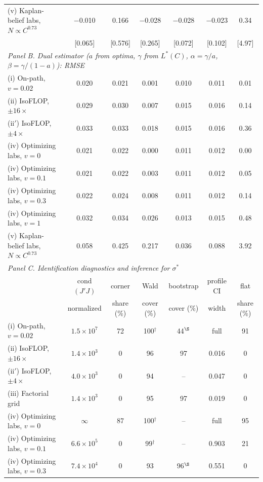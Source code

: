 \begin{table}[!htbp]
\begin{threeparttable}
\begin{tabular}{lcccccc}
(v) Kaplan-belief labs, $N\propto C^{0.73}$ & $-$0.010 & 0.166 & $-$0.028 & $-$0.028 & $-$0.023 & 0.34 \\
 & [0.065] & [0.576] & [0.265] & [0.072] & [0.102] & [4.97] \\[2pt]
\midrule
\multicolumn{7}{l}{\textit{Panel B. Dual estimator ($a$ from optima, $\gamma$ from $L^*(C)$, $\alpha=\gamma/a$, $\beta=\gamma/(1-a)$): RMSE}} \\
(i) On-path, $v=0.02$ & 0.020 & 0.021 & 0.001 & 0.010 & 0.011 & 0.01 \\
(ii) IsoFLOP, $\pm16\times$ & 0.029 & 0.030 & 0.007 & 0.015 & 0.016 & 0.14 \\
(ii$'$) IsoFLOP, $\pm4\times$ & 0.033 & 0.033 & 0.018 & 0.015 & 0.016 & 0.36 \\
(iv) Optimizing labs, $v=0$ & 0.021 & 0.022 & 0.000 & 0.011 & 0.012 & 0.00 \\
(iv) Optimizing labs, $v=0.1$ & 0.021 & 0.022 & 0.003 & 0.011 & 0.012 & 0.05 \\
(iv) Optimizing labs, $v=0.3$ & 0.022 & 0.024 & 0.008 & 0.011 & 0.012 & 0.14 \\
(iv) Optimizing labs, $v=1$ & 0.032 & 0.034 & 0.026 & 0.013 & 0.015 & 0.48 \\
(v) Kaplan-belief labs, $N\propto C^{0.73}$ & 0.058 & 0.425 & 0.217 & 0.036 & 0.088 & 3.92 \\
\midrule
\multicolumn{7}{l}{\textit{Panel C. Identification diagnostics and inference for $\sigma^*$}} \\
 & cond$(J'J)$ & corner & Wald & bootstrap & profile CI & flat \\
 & normalized & share (\%) & cover (\%) & cover (\%) & width & share (\%) \\
\midrule
(i) On-path, $v=0.02$ & $1.5\times10^{7}$ & 72 & 100$^{\dagger}$ & 44$^{\S}$ & full & 91 \\
(ii) IsoFLOP, $\pm16\times$ & $1.4\times10^{3}$ & 0 & 96 & 97 & 0.016 & 0 \\
(ii$'$) IsoFLOP, $\pm4\times$ & $4.0\times10^{3}$ & 0 & 94 & -- & 0.047 & 0 \\
(iii) Factorial grid & $1.4\times10^{3}$ & 0 & 95 & 97 & 0.019 & 0 \\
(iv) Optimizing labs, $v=0$ & $\infty$ & 87 & 100$^{\dagger}$ & -- & full & 95 \\
(iv) Optimizing labs, $v=0.1$ & $6.6\times10^{5}$ & 0 & 99$^{\dagger}$ & -- & 0.903 & 21 \\
(iv) Optimizing labs, $v=0.3$ & $7.4\times10^{4}$ & 0 & 93 & 96$^{\S}$ & 0.551 & 0 \\

\end{tabular}
\end{threeparttable}
\end{table}
